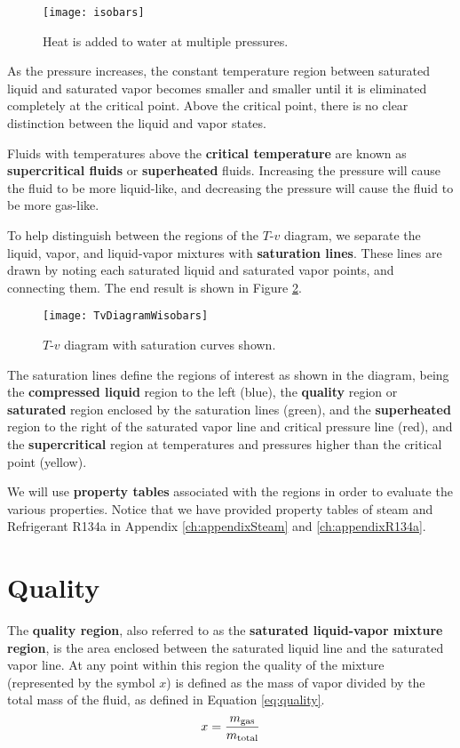 \begin{figure}[H]
\centering
\texttt{[image: isobars]}
\caption{Heat is added to water at multiple pressures.}
\label{fig:ch2_TvDiagram2}
\end{figure}

As the pressure increases, the constant temperature region between saturated liquid and saturated vapor becomes smaller and smaller until it is eliminated completely at the critical point.  Above the critical point, there is no clear distinction between the liquid and vapor states.

Fluids with temperatures above the {\bf critical temperature} are known as {\bf supercritical fluids} or {\bf superheated} fluids.  Increasing the pressure will cause the fluid to be more liquid-like, and decreasing the pressure will cause the fluid to be more gas-like. 

To help distinguish between the regions of the $T$-$v$ diagram, we separate the liquid, vapor, and liquid-vapor mixtures with {\bf saturation lines}.  These lines are drawn by noting each saturated liquid and saturated vapor points, and connecting them.  The end result is shown in Figure \ref{fig:ch2_TvDiagram3}.

\begin{figure}[H]
\centering
\texttt{[image: TvDiagramWisobars]}
\caption{$T$-$v$ diagram with saturation curves shown.}
\label{fig:ch2_TvDiagram3}
\end{figure}

The saturation lines define the regions of interest as shown in the diagram, being the {\bf compressed liquid} region to the left (blue), the {\bf quality} region or {\bf saturated} region enclosed by the saturation lines (green), and the {\bf superheated} region to the right of the saturated vapor line and critical pressure line (red), and the {\bf supercritical} region at temperatures and pressures higher than the critical point (yellow).

We will use {\bf property tables} associated with the regions in order to evaluate the various properties. Notice that we have provided property tables of steam and Refrigerant R134a in Appendix \ref{ch:appendixSteam} and \ref{ch:appendixR134a}.

\section{Quality}

The {\bf quality region}, also referred to as the {\bf saturated liquid-vapor mixture region}, is the area enclosed between the saturated liquid line and the saturated vapor line. At any point within this region the quality of the mixture (represented by the symbol $x$) is defined as the mass of vapor divided by the total mass of the fluid, as defined in Equation \ref{eq:quality}.
\begin{equation} \label{eq:quality}
  x = \frac{m_{\rm gas}}{m_{\rm total}}
\end{equation}

